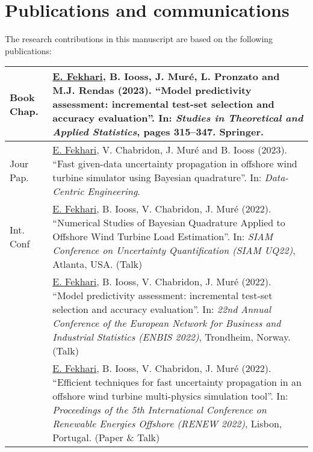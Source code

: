 \newpage
\section*{Publications and communications}

The research contributions in this manuscript are based on the following publications: 

\begin{table*}[h]
    \small
    \renewcommand*{\arraystretch}{1.4}
    \begin{tabularx}{\textwidth}{l X}
        Book Chap. & \underline{E. Fekhari}, B. Iooss, J. Muré, L. Pronzato and M.J. Rendas (2023). 
                    ``Model predictivity assessment: incremental test-set selection and accuracy evaluation''. 
                    In: \textit{Studies in Theoretical and Applied Statistics}, pages 315--347. Springer.\\
        \hline
        Jour Pap.   & \underline{E. Fekhari}, V. Chabridon, J. Muré and B. Iooss (2023).
                    ``Fast given-data uncertainty propagation in offshore wind turbine simulator using Bayesian quadrature''. 
                    In: \textit{Data-Centric Engineering}.\\
        \hline
        Int. Conf   & \underline{E. Fekhari}, B. Iooss, V. Chabridon, J. Muré (2022).
                    ``Numerical Studies of Bayesian Quadrature Applied to Offshore Wind Turbine Load Estimation''.
                    In: \textit{SIAM Conference on Uncertainty Quantification (SIAM UQ22)}, Atlanta, USA. (Talk)\\
        
                    & \underline{E. Fekhari}, B. Iooss, V. Chabridon, J. Muré (2022). 
                    ``Model predictivity assessment: incremental test-set selection and accuracy evaluation''.
                    In: \textit{22nd Annual Conference of the European Network for Business and Industrial Statistics (ENBIS 2022)}, Trondheim, Norway. (Talk)\\
        
                    & \underline{E. Fekhari}, B. Iooss, V. Chabridon, J. Muré (2022). 
                    ``Efficient techniques for fast uncertainty propagation in an offshore wind turbine multi-physics simulation tool''.
                    In: \textit{Proceedings of the 5th International Conference on Renewable Energies Offshore (RENEW 2022)}, Lisbon, Portugal. (Paper \& Talk)\\
        

\end{tabularx}
\end{table*}
